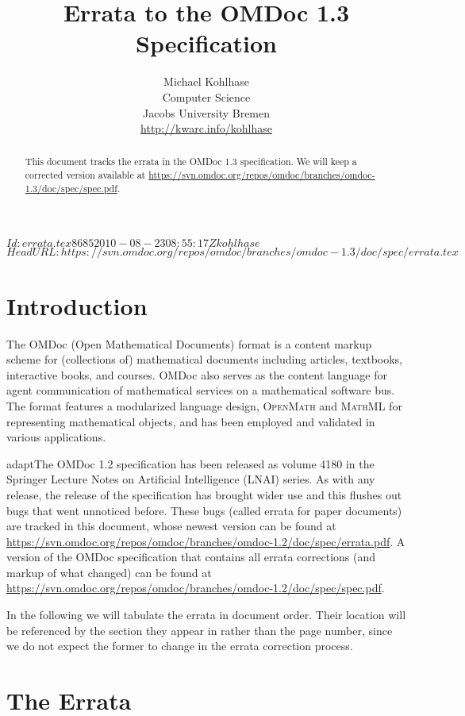\documentclass{article}
\title{Errata to the OMDoc 1.3 Specification}
\author{Michael Kohlhase\\
  Computer Science\\
  Jacobs University Bremen\\
  \url{http://kwarc.info/kohlhase}}
\def\omdoc{OMDoc}
\def\mathml{\scshape{MathML}}
\def\openmath{\scshape{OpenMath}}
\begin{document}
\maketitle
\svnInfo $Id: errata.tex 8685 2010-08-23 08:55:17Z kohlhase $
\svnKeyword $HeadURL: https://svn.omdoc.org/repos/omdoc/branches/omdoc-1.3/doc/spec/errata.tex $
\begin{abstract}
  This document tracks the errata in the OMDoc 1.3 specification. We
  will keep a corrected version available at
  \url{https://svn.omdoc.org/repos/omdoc/branches/omdoc-1.3/doc/spec/spec.pdf}.
\end{abstract}

\section{Introduction}
The {\omdoc} (Open Mathematical Documents) format is a content markup scheme for
(collections of) mathematical documents including articles, textbooks, interactive books,
and courses.  {\omdoc} also serves as the content language for agent communication of
mathematical services on a mathematical software bus.  The format features a modularized
language design, {\openmath} and {\mathml} for representing mathematical objects, and has
been employed and validated in various applications.

\begin{oldpart}{adapt}The {\omdoc} 1.2 specification has been released as volume 4180 in the Springer Lecture
Notes on Artificial Intelligence (LNAI) series. As with any release, the release of the
specification has brought wider use and this flushes out bugs that went unnoticed before.
These bugs (called errata for paper documents) are tracked in this document, whose newest
version can be found at
\url{https://svn.omdoc.org/repos/omdoc/branches/omdoc-1.2/doc/spec/errata.pdf}. A
version of the OMDoc specification that contains all errata corrections (and markup of
what changed) can be found at
\url{https://svn.omdoc.org/repos/omdoc/branches/omdoc-1.2/doc/spec/spec.pdf}.

In the following we will tabulate the errata in document order. Their location will be
referenced by the section they appear in rather than the page number, since we do not
expect the former to change in the errata correction process.
\end{oldpart}
\newpage
\section{The Errata}
\end{document}
